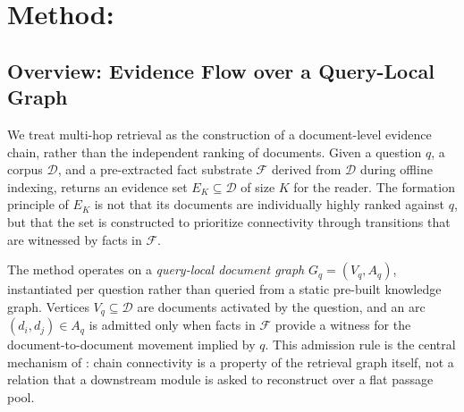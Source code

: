 %
%
%
%

\section{Method: \methodname{}}
\label{sec:method}

\subsection{Overview: Evidence Flow over a Query-Local Graph}
\label{sec:method:overview}

We treat multi-hop retrieval as the construction of a document-level evidence
chain, rather than the independent ranking of documents. Given a question $q$,
a corpus $\mathcal{D}$, and a pre-extracted fact substrate $\mathcal{F}$
derived from $\mathcal{D}$ during offline indexing, \methodname{} returns an
evidence set $E_K \subseteq \mathcal{D}$ of size $K$ for the reader. The
formation principle of $E_K$ is not that its documents are individually
highly ranked against $q$, but that the set is constructed to prioritize
connectivity through transitions that are witnessed by facts in
$\mathcal{F}$.

The method operates on a \emph{query-local document graph}
$G_q = (V_q, A_q)$, instantiated per question rather than queried from a
static pre-built knowledge graph. Vertices $V_q \subseteq \mathcal{D}$ are
documents activated by the question, and an arc
$(d_i, d_j) \in A_q$ is admitted only when facts in $\mathcal{F}$ provide
a witness for the document-to-document movement implied by $q$. This
admission rule is the central mechanism of \methodname{}: chain
connectivity is a property of the retrieval graph itself, not a relation
that a downstream module is asked to reconstruct over a flat passage pool.

